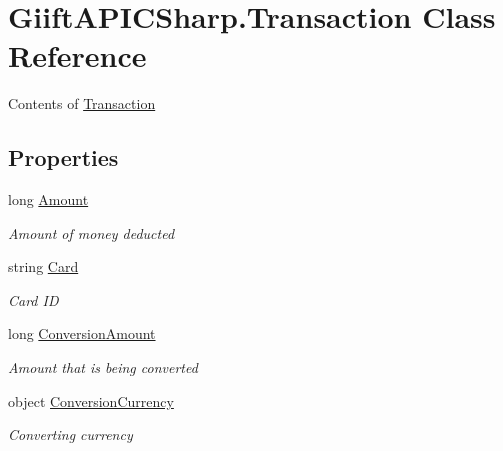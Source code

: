 \hypertarget{class_giift_a_p_i_c_sharp_1_1_transaction}{}\section{Giift\+A\+P\+I\+C\+Sharp.\+Transaction Class Reference}
\label{class_giift_a_p_i_c_sharp_1_1_transaction}


Contents of \hyperlink{class_giift_a_p_i_c_sharp_1_1_transaction}{Transaction}  


\subsection*{Properties}
\begin{DoxyCompactItemize}
\item 
long \hyperlink{class_giift_a_p_i_c_sharp_1_1_transaction_a26586ac1f413afeb519601c380c7f5d0}{Amount}
\begin{DoxyCompactList}\small\item\em Amount of money deducted \end{DoxyCompactList}\item 
string \hyperlink{class_giift_a_p_i_c_sharp_1_1_transaction_acf87afe5f16e1e8be5eec5d44554a305}{Card}
\begin{DoxyCompactList}\small\item\em Card ID \end{DoxyCompactList}\item 
long \hyperlink{class_giift_a_p_i_c_sharp_1_1_transaction_a77a76c1f69a9b86ee7bbe667494a6006}{Conversion\+Amount}
\begin{DoxyCompactList}\small\item\em Amount that is being converted \end{DoxyCompactList}\item 
object \hyperlink{class_giift_a_p_i_c_sharp_1_1_transaction_accb61a52ecdc52935359525980cd3fb0}{Conversion\+Currency}
\begin{DoxyCompactList}\small\item\em Converting currency \end{DoxyCompactList}\item 

\end{DoxyCompactItemize}
